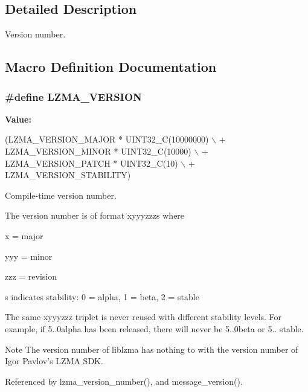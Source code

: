 \subsection{Detailed Description}
Version number. 

\subsection{Macro Definition Documentation}
\subsubsection[{L\-Z\-M\-A\-\_\-\-V\-E\-R\-S\-I\-O\-N}]{\setlength{\rightskip}{0pt plus 5cm}\#define L\-Z\-M\-A\-\_\-\-V\-E\-R\-S\-I\-O\-N}\label{version_8h_a156c47ff34aa0c2b726d0daf799f10a0}
{\bfseries Value\-:}
\begin{DoxyCode}
(LZMA\_VERSION\_MAJOR * UINT32\_C(10000000) \(\backslash\)
                + LZMA\_VERSION\_MINOR * UINT32\_C(10000) \(\backslash\)
                + LZMA\_VERSION\_PATCH * UINT32\_C(10) \(\backslash\)
                + LZMA\_VERSION\_STABILITY)
\end{DoxyCode}


Compile-\/time version number. 

The version number is of format xyyyzzzs where
\begin{DoxyItemize}
\item x = major
\item yyy = minor
\item zzz = revision
\item s indicates stability\-: 0 = alpha, 1 = beta, 2 = stable
\end{DoxyItemize}

The same xyyyzzz triplet is never reused with different stability levels. For example, if 5..\-0alpha has been released, there will never be 5..\-0beta or 5.. stable.

\begin{DoxyNote}{Note}
The version number of liblzma has nothing to with the version number of Igor Pavlov's L\-Z\-M\-A S\-D\-K. 
\end{DoxyNote}


Referenced by lzma\-\_\-version\-\_\-number(), and message\-\_\-version().

